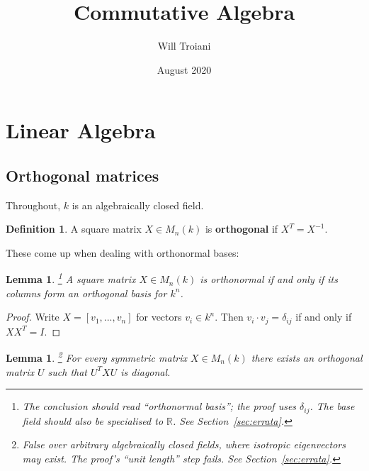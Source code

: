 \documentclass[12pt]{article}
\title{Commutative Algebra}
\author{Will Troiani}
\date{August 2020}
\theoremstyle{plain}
\newtheorem{lemma}[thm]{Lemma}
\theoremstyle{definition}
\newtheorem{defn}[thm]{Definition} %
\begin{document}
\maketitle
\tableofcontents

\section{Linear Algebra}
\subsection{Orthogonal matrices}
Throughout, $k$ is an algebraically closed field.
\begin{defn}
A square matrix $X \in M_n(k)$ is \textbf{orthogonal} if $X^T = X^{-1}$.
\end{defn}
These come up when dealing with orthonormal bases:
\begin{lemma}
\label{lem:orthonormal}\footnote{The conclusion should read ``orthonormal basis''; the proof uses $\delta_{ij}$. The base field should also be specialised to $\mathbb{R}$. See Section~\ref{sec:errata}.} A square matrix $X \in M_n(k)$ is orthonormal if and only if its columns form an orthogonal basis for $k^n$.
\end{lemma}
\begin{proof}
Write $X = [v_1, ..., v_n]$ for vectors $v_i \in k^n$. Then $v_i\cdot v_j = \delta_{ij}$ if and only if $XX^T = I$.
\end{proof}
\begin{lemma}
\label{lem:symm_diag}\footnote{False over arbitrary algebraically closed fields, where isotropic eigenvectors may exist. The proof's ``unit length'' step fails. See Section~\ref{sec:errata}.} For every symmetric matrix $X \in M_n(k)$ there exists an orthogonal matrix $U$ such that $U^TXU$ is diagonal.
\end{lemma}
\end{document}
